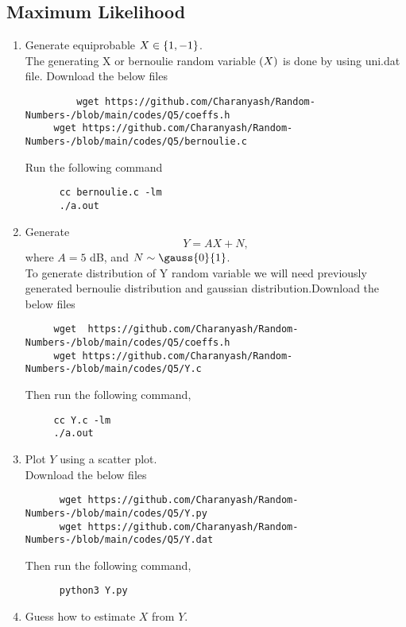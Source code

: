 \documentclass[journal,12pt,twocolumn]{IEEEtran}
\begin{document}
\begin{enumerate}[label=\thesection.\arabic*
,ref=\thesection.\theenumi]
\section{Maximum Likelihood}
\begin{enumerate}[label=\thesection.\arabic*
,ref=\thesection.\theenumi]
\item Generate equiprobable $X \in \left\{1,-1\right\}$.\\	
  \solution The generating X or bernoulie random variable $ \left(X\right)$ is done by using uni.dat file. Download the below files
    \begin{lstlisting}
         wget https://github.com/Charanyash/Random-Numbers-/blob/main/codes/Q5/coeffs.h
	 wget https://github.com/Charanyash/Random-Numbers-/blob/main/codes/Q5/bernoulie.c
    \end{lstlisting}
  Run the following command
    \begin{lstlisting}
	  cc bernoulie.c -lm
	  ./a.out 
    \end{lstlisting} 
\item Generate
\begin{equation}
Y = AX+N,
\end{equation}
	where $A = 5$ dB,  and $N \sim \gauss{0}{1}$.\\
  \solution To generate distribution of Y random variable we will need previously generated bernoulie distribution and gaussian distribution.Download the below files
    \begin{lstlisting}
     wget  https://github.com/Charanyash/Random-Numbers-/blob/main/codes/Q5/coeffs.h
     wget https://github.com/Charanyash/Random-Numbers-/blob/main/codes/Q5/Y.c
    \end{lstlisting}
   Then run the following command,
    \begin{lstlisting}
     cc Y.c -lm
     ./a.out
    \end{lstlisting}
\item Plot $Y$ using a scatter plot.\\
 \solution Download the below files
    \begin{lstlisting}
      wget https://github.com/Charanyash/Random-Numbers-/blob/main/codes/Q5/Y.py
      wget https://github.com/Charanyash/Random-Numbers-/blob/main/codes/Q5/Y.dat
    \end{lstlisting}
   Then run the following command,
    \begin{lstlisting}
      python3 Y.py
    \end{lstlisting}		
\item Guess how to estimate $X$ from $Y$.

\end{enumerate}
\end{enumerate}
\end{document}
